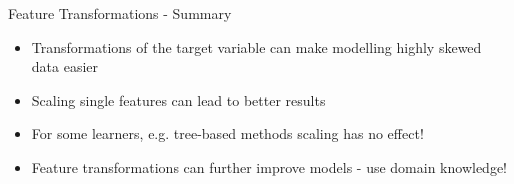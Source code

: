 \documentclass[11pt,compress,t,notes=noshow, xcolor=table]{beamer}
\begin{document}
\begin{vbframe}{Feature Transformations - Summary}

\begin{itemize}
\item Transformations of the target variable can make modelling highly skewed data easier

\item Scaling single features can lead to better results

\item For some learners, e.g. tree-based methods scaling has no effect!

\item Feature transformations can further improve models - use domain knowledge!
\end{itemize}

\end{vbframe}



\endlecture
\end{document}
